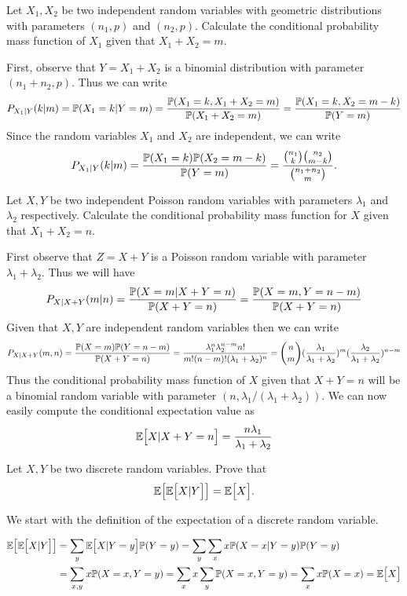 \begin{problem}
	Let $ X_1,X_2 $ be two independent random variables with geometric distributions with parameters $ (n_1,p) $ and $ (n_2,p) $. Calculate the conditional probability mass function of $ X_1 $ given that $ X_1+X_2 = m $.
\end{problem}
\begin{solution}
	First, observe that $ Y = X_1 + X_2 $ is a binomial distribution with parameter $ (n_1+n_2, p) $. Thus we can write
	\[ P_{X_1|Y}(k|m) = \mathbb{P}(X_1 = k | Y = m) = \frac{\mathbb{P}(X_1 = k, X_1+X_2 = m)}{\mathbb{P}(X_1+X_2 = m)} = \frac{\mathbb{P}(X_1=k, X_2 = m-k)}{\mathbb{P}(Y = m)} \]
	Since the random variables $ X_1 $ and $ X_2 $ are independent, we can write
	\[ P_{X_1|Y}(k|m) = \frac{\mathbb{P}(X_1=k)\mathbb{P}(X_2 = m-k)}{\mathbb{P}(Y=m)} = \frac{\binom{n_1}{k}\binom{n_2}{m-k}}{\binom{n_1+n_2}{m}}. \]
\end{solution}

\begin{problem}
	Let $ X,Y $ be two independent Poisson random variables with parameters $ \lambda_1 $ and $ \lambda_2 $ respectively. Calculate the conditional probability mass function for $ X $ given that $ X_1 + X_2 = n $.
\end{problem}
\begin{solution}
	First observe that $ Z = X + Y $ is a Poisson random variable with parameter $ \lambda_1 + \lambda_2 $. Thus we will have
	\[ P_{X|X+Y}(m|n) = \frac{\mathbb{P}(X=m|X+Y=n)}{\mathbb{P}(X+Y = n)} = \frac{\mathbb{P}(X=m,Y=n-m)}{\mathbb{P}(X+Y = n)} \]
	Given that $ X,Y $ are independent random variables then we can write
	\[ P_{X|X+Y}(m,n) = \frac{\mathbb{P}(X=m)\mathbb{P}(Y=n-m)}{\mathbb{P}(X+Y=n)} = \frac{\lambda_1^n \lambda_2^{n-m}n!}{m!(n-m)!(\lambda_1+\lambda_2)^n} = \binom{n}{m} (\frac{\lambda_1}{\lambda_1+\lambda_2})^m ( \frac{\lambda_2}{\lambda_1+\lambda_2})^{n-m} \]
	Thus the conditional probability mass function of $ X $ given that $ X+Y = n $ will be a binomial random variable with parameter $ (n,\lambda_1/(\lambda_1+\lambda_2)) $. We can now easily compute the conditional expectation value as
	\[ \mathbb{E}\big[X|X+Y = n\big] = \frac{n\lambda_1}{\lambda_1 + \lambda_2} \]
\end{solution}

\begin{problem}
	Let $ X,Y $ be two discrete random variables. Prove that 
	\[ \mathbb{E}\big[\mathbb{E}\big[X|Y\big]\big] = \mathbb{E}\big[X\big]. \]
\end{problem}
\begin{solution}
	We start with the definition of the expectation of a discrete random variable.

	\begin{align*}
		\mathbb{E}\big[\mathbb{E}\big[X|Y\big]\big] &= \sum_y \mathbb{E}\big[X|Y=y\big] \mathbb{P}(Y=y) = \sum_y \sum_x x\mathbb{P}(X=x|Y=y)\mathbb{P}(Y=y) \\
		& = \sum_{x,y} x\mathbb{P}(X=x,Y=y) = \sum_x x \sum_y \mathbb{P}(X=x,Y=y) = \sum_x x\mathbb{P}(X=x) = \mathbb{E}\big[X\big]
	\end{align*}
\end{solution}

